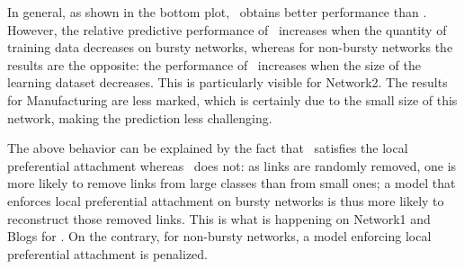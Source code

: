 In general, as shown in the bottom plot, \ifm\ obtains better performance than \imb. However, the relative predictive performance of \imb\  increases  when the quantity of training data decreases on bursty networks, whereas for non-bursty networks the results are the opposite: the performance of \ifm\ increases when the size of the learning dataset decreases. This is particularly visible for Network2. The results for Manufacturing are less marked, which is certainly due to the small size of this network, making the prediction less challenging.

The above behavior can be explained by the fact that \imb\ satisfies the local preferential attachment whereas \ifm\ does not: as links are randomly removed, one is more likely to remove links from large classes than from small ones; a model that enforces local preferential attachment on bursty networks is thus more likely to reconstruct those removed links. This is what is happening on Network1 and Blogs for \imb. On the contrary, for non-bursty networks, a model enforcing local preferential attachment is penalized.


